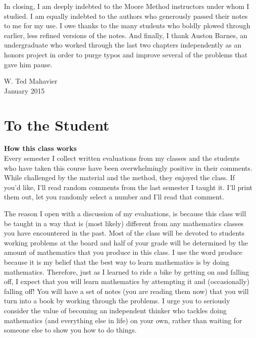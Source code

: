 \begin{annotation}
In closing, I am deeply indebted to the Moore Method instructors under whom I studied.  I am equally indebted to the authors who generously passed their notes to me for my use.  I owe thanks to the many students who boldly plowed through earlier, less refined versions of the notes.  And finally, I thank Auston Barnes, an undergraduate who worked through the last two chapters independently as an honors project in order to purge typos and improve several of the problems that gave him pause.
\medskip

\noindent W. Ted Mahavier\\
January 2015

\end{annotation}


\chapter{To the Student}

\noindent
\textbf{How this class works}\\

Every semester I collect written evaluations from my classes and the students who have taken this course have been overwhelmingly positive in their comments.   While challenged by the material and the method, they enjoyed the class.  If you'd like, I'll read random comments from the last semester I taught it. I'll print them out, let you randomly select a number and I'll read that comment.

The reason I open with a discussion of my evaluations, is because this class will be taught in a way that is (most likely) different from any mathematics classes you have encountered in the past.  Most of the class will be devoted to students working problems at the board and half of your grade will be determined by the amount of mathematics that you produce in this class.  I use the word produce because it is my belief that the best way to learn mathematics is by doing mathematics.  Therefore, just as I learned to ride a bike by getting on and falling off, I expect that you will learn mathematics by attempting it and (occasionally) falling off!  You will have a set of notes (you are reading them now) that you will turn into a book by working through the problems.  I urge you to seriously consider the value of becoming an independent thinker who tackles doing mathematics (and everything else in life) on your own, rather than waiting for someone else to show you how to do things.\\

